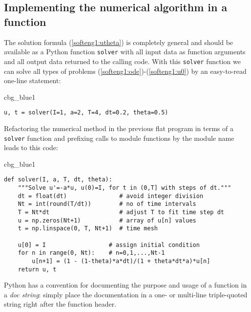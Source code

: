 \documentclass[graybox,sectrefs,envcountresetchap,open=right,final]{svmonodo}
\newenvironment{_cod_tight}[1]{
   \def\FrameCommand{\colorbox{#1}}
   \FrameRule0.6pt\MakeFramed {\FrameRestore}\vskip3mm}
   {\vskip0mm\endMakeFramed}
\newenvironment{cod}[1]{
\bgroup\rmfamily
\fboxsep=0mm\relax
\begin{_cod_tight}{#1}
\list{}{\parsep=-2mm\parskip=0mm\topsep=0pt\leftmargin=2mm
\rightmargin=2\leftmargin\leftmargin=4pt\relax}
\item\relax}
{\endlist\end{_cod_tight}\egroup}
\newenvironment{notice_mdfboxadmon}[1][]{
\begin{notice_mdfboxmdframed}[frametitle=#1]
}
{
\end{notice_mdfboxmdframed}
}
\begin{document}
\subsection{Implementing the numerical algorithm in a function}
\label{softeng1:basic:func}

The solution formula (\ref{softeng1:utheta}) is completely general and
should be available as a Python function \texttt{solver} with all input data as
function arguments and all output data returned to the calling code.
With this \texttt{solver} function we can solve all types of problems
(\ref{softeng1:ode})-(\ref{softeng1:u0})
by an easy-to-read one-line statement:

\begin{cod}{cbg_blue1}\begin{Verbatim}[numbers=none,fontsize=\fontsize{9pt}{9pt},baselinestretch=0.95,xleftmargin=2mm]
u, t = solver(I=1, a=2, T=4, dt=0.2, theta=0.5)
\end{Verbatim}
\end{cod}
\noindent

Refactoring the numerical method in the previous flat program
in terms of a \texttt{solver} function and prefixing calls to
module functions by the module name leads to this code:

\begin{cod}{cbg_blue1}\begin{Verbatim}[numbers=none,fontsize=\fontsize{9pt}{9pt},baselinestretch=0.95,xleftmargin=2mm]
def solver(I, a, T, dt, theta):
    """Solve u'=-a*u, u(0)=I, for t in (0,T] with steps of dt."""
    dt = float(dt)               # avoid integer division
    Nt = int(round(T/dt))        # no of time intervals
    T = Nt*dt                    # adjust T to fit time step dt
    u = np.zeros(Nt+1)           # array of u[n] values
    t = np.linspace(0, T, Nt+1)  # time mesh

    u[0] = I                  # assign initial condition
    for n in range(0, Nt):    # n=0,1,...,Nt-1
        u[n+1] = (1 - (1-theta)*a*dt)/(1 + theta*dt*a)*u[n]
    return u, t
\end{Verbatim}
\end{cod}
\noindent


\begin{notice_mdfboxadmon}
Python has a convention for documenting the purpose and usage of
a function in a \emph{doc string}: simply place the documentation
in a one- or multi-line triple-quoted string right after the
function header.
\end{notice_mdfboxadmon}
\end{document}
